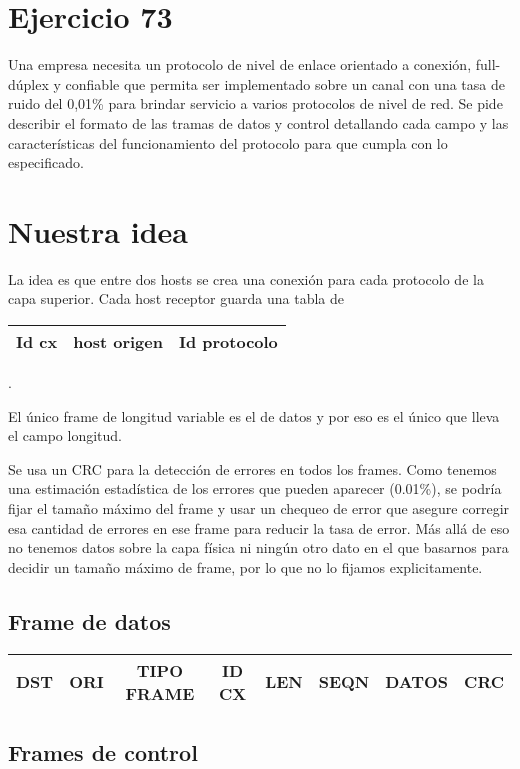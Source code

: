 \documentclass[a4paper,10pt]{article}
\begin{document}
\section*{Ejercicio 73}
   Una empresa necesita un protocolo de nivel de enlace orientado a conexión, full-dúplex y confiable que 
   permita ser implementado sobre un canal con una tasa de ruido del 0,01\% para brindar servicio a varios 
   protocolos de nivel de red. Se pide describir el formato de las tramas de datos y control detallando 
   cada campo y las características del funcionamiento del protocolo para que cumpla con lo especificado.

\section*{Nuestra idea}

La idea es que entre dos hosts se crea una conexión para cada protocolo de la capa superior.  Cada host receptor guarda una tabla de 
\begin{tabular}{|c|c|c|}\hline
Id cx &host origen &Id protocolo\\\hline
\end{tabular}.

El único frame de longitud variable es el de datos y por eso es el único que lleva el campo longitud.

Se usa un CRC para la detección de errores en todos los frames.  Como tenemos
una estimación estadística de los errores que pueden aparecer (0.01\%), se
podría fijar el tamaño máximo del frame y usar un chequeo de error que asegure
corregir esa cantidad de errores en ese frame para reducir la tasa de error.
Más allá de eso no tenemos datos sobre la capa física ni ningún otro dato en el
que basarnos para decidir un tamaño máximo de frame, por lo que no lo fijamos
explicitamente.

\subsection*{Frame de datos}

\begin{tabular}{|c|c|c|c|c|c|c|c|}\hline
	DST & ORI & TIPO FRAME & ID CX & LEN & SEQN & DATOS & CRC \\ \hline
\end{tabular}

\subsection*{Frames de control}
\end{document}
